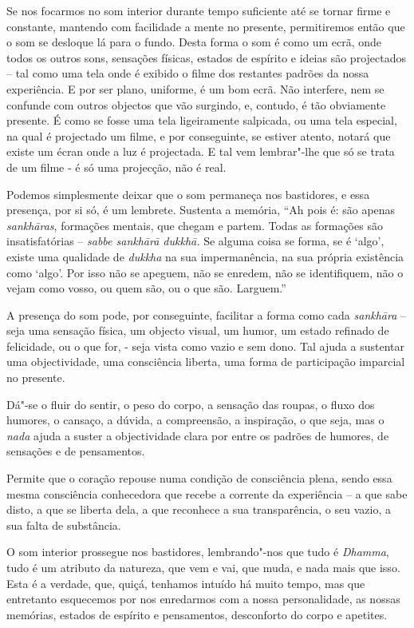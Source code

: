 Se nos focarmos no som interior durante tempo suficiente até se tornar
firme e constante, mantendo com facilidade a mente no presente,
permitiremos então que o som se desloque lá para o fundo. Desta forma o
som é como um ecrã, onde todos os outros sons, sensações físicas,
estados de espírito e ideias são projectados -- tal como uma tela onde é
exibido o filme dos restantes padrões da nossa experiência. E por ser
plano, uniforme, é um bom ecrã. Não interfere, nem se confunde com
outros objectos que vão surgindo, e, contudo, é tão obviamente presente.
É como se fosse uma tela ligeiramente salpicada, ou uma tela especial,
na qual é projectado um filme, e por conseguinte, se estiver atento,
notará que existe um écran onde a luz é projectada. E tal vem
lembrar"-lhe que só se trata de um filme - é só uma projecção, não é
real.

Podemos simplesmente deixar que o som permaneça nos bastidores, e essa
presença, por si só, é um lembrete. Sustenta a memória, ``Ah pois é: são
apenas \emph{sankhāras}, formações mentais, que chegam e partem. Todas
as formações são insatisfatórias -- \emph{sabbe sankhārā dukkhā.} Se
alguma coisa se forma, se é `algo', existe uma qualidade de
\emph{dukkha} na sua impermanência, na sua própria existência como
`algo'. Por isso não se apeguem, não se enredem, não se identifiquem,
não o vejam como vosso, ou quem são, ou o que são. Larguem.''

A presença do som pode, por conseguinte, facilitar a forma como cada
\emph{sankhāra} -- seja uma sensação física, um objecto visual, um
humor, um estado refinado de felicidade, ou o que for, - seja vista como
vazio e sem dono. Tal ajuda a sustentar uma objectividade, uma
consciência liberta, uma forma de participação imparcial no presente.

Dá"-se o fluir do sentir, o peso do corpo, a sensação das roupas, o fluxo
dos humores, o cansaço, a dúvida, a compreensão, a inspiração, o que
seja, mas o \emph{nada} ajuda a suster a objectividade clara por entre
os padrões de humores, de sensações e de pensamentos.

Permite que o coração repouse numa condição de consciência plena, sendo
essa mesma consciência conhecedora que recebe a corrente da experiência
-- a que sabe disto, a que se liberta dela, a que reconhece a sua
transparência, o seu vazio, a sua falta de substância.

O som interior prossegue nos bastidores, lembrando"-nos que tudo é
\emph{Dhamma}, tudo é um atributo da natureza, que vem e vai, que muda,
e nada mais que isso. Esta é a verdade, que, quiçá, tenhamos intuído há
muito tempo, mas que entretanto esquecemos por nos enredarmos com a
nossa personalidade, as nossas memórias, estados de espírito e
pensamentos, desconforto do corpo e apetites.


